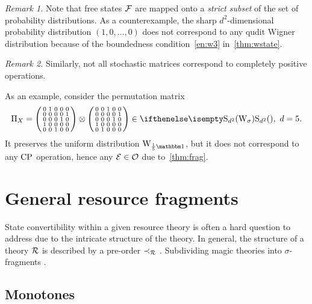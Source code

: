 \documentclass[pra,
aps,
twocolumn,
superscriptaddress,
groupedaddress,
nofootinbib,
reprint
]{revtex4-1}
\begin{document}
\emph{Remark 1.} Note that free states $\mathcal{F}$ are mapped onto a \emph{strict subset} of the set of probability distributions.
As a counterexample, the sharp $d^2$-dimensional probability distribution $(1, 0, \dots, 0)$ does not correspond to any qudit Wigner distribution because of the boundedness condition~\ref{en:w3} in~\cref{thm:wstate}.

\emph{Remark 2.} Similarly, not all stochastic matrices correspond to completely positive operations.

As an example, consider the permutation matrix
\begin{equation}
    \Pi_X = \begin{psmallmatrix}
        0 & 1 & 0 & 0 & 0 \\
        0 & 0 & 0 & 0 & 1 \\
        0 & 0 & 0 & 1 & 0 \\
        1 & 0 & 0 & 0 & 0 \\
        0 & 0 & 1 & 0 & 0
    \end{psmallmatrix} \otimes \begin{psmallmatrix}
        0 & 0 & 1 & 0 & 0 \\
        0 & 0 & 0 & 0 & 1 \\
        0 & 0 & 0 & 1 & 0 \\
        1 & 0 & 0 & 0 & 0 \\
        0 & 1 & 0 & 0 & 0    
    \end{psmallmatrix} \in \stochw,\ d=5.
\end{equation}
It preserves the uniform distribution $\W{\frac{1}{5}\id}{}$, but it does not correspond to any ${\rm{CP}}$ operation, hence any $\mathcal{E} \in \mathcal{O}$ due to~\cref{thm:frag}.


\section{General resource fragments}
\label{sec:frag}

State convertibility within a given resource theory is often a hard question to address due to the intricate structure of the theory.
In general, the structure of a theory $\mathcal{R}$ is described by a pre-order $\prec_{\mathcal{R}}$ .
Subdividing magic theories into $\sigma$-fragments .
\subsection{Monotones}\label{sec:mono}
\end{document}
